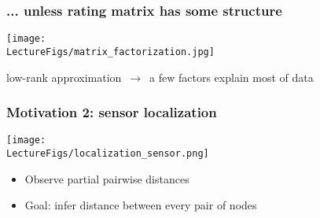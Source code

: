 \documentclass[compress,
mathserif,wide,%
]{beamer}
\begin{document}
\begin{frame}
  \frametitle{... unless rating matrix has some structure} 

\begin{center}
\texttt{[image: \\LectureFigs/matrix\_factorization.jpg]} \\
\end{center}


  \vfill 
  
  \begin{center}
  \alert{low-rank} approximation~$\longrightarrow$~a few factors explain most of  data  
\end{center}


\end{frame}


\begin{frame}
\frametitle{Motivation 2: sensor localization}  

\begin{center}
\texttt{[image: \\LectureFigs/localization\_sensor.png]}
\end{center} 
\begin{itemize}

%
\item Observe partial pairwise distances

\item Goal: infer distance between every pair of nodes

\end{itemize}



\end{frame}
\end{document}
